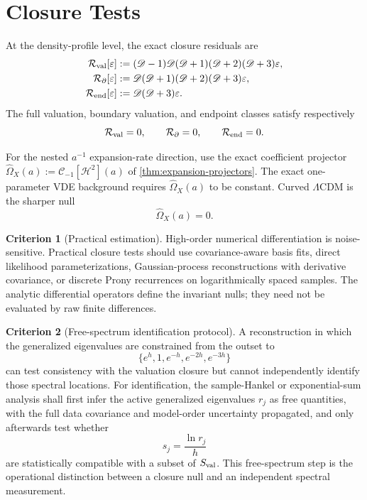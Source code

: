 \documentclass[aps,prd,preprint,onecolumn,nofootinbib,superscriptaddress,showkeys]{revtex4-2}
\numberwithin{equation}{section}
\theoremstyle{definition}
\newtheorem{criterion}{Criterion}[section]
\theoremstyle{plain}
\newcommand{\Dil}{\mathscr D}
\begin{document}
\section{Closure Tests}

At the density-profile level, the exact closure residuals are
\begin{align}
\mathcal R_{\rm val}[\varepsilon]
&:=
(\Dil-1)\Dil(\Dil+1)(\Dil+2)(\Dil+3)\varepsilon,\\
\mathcal R_{\partial}[\varepsilon]
&:=
\Dil(\Dil+1)(\Dil+2)(\Dil+3)\varepsilon,\\
\mathcal R_{\rm end}[\varepsilon]
&:=
\Dil(\Dil+3)\varepsilon.
\end{align}
The full valuation, boundary valuation, and endpoint classes satisfy respectively
\begin{equation}
\mathcal R_{\rm val}=0,
\qquad
\mathcal R_{\partial}=0,
\qquad
\mathcal R_{\rm end}=0.
\end{equation}

For the nested \(a^{-1}\) expansion-rate direction, use the exact coefficient projector \(\widehat\Omega_X(a):=\mathcal C_{-1}[\mathcal H^2](a)\) of \cref{thm:expansion-projectors}.
The exact one-parameter VDE background requires \(\widehat\Omega_X(a)\) to be constant.  Curved \(\Lambda\)CDM is the sharper null
\begin{equation}
\widehat\Omega_X(a)=0.
\end{equation}

\begin{criterion}[Practical estimation]
High-order numerical differentiation is noise-sensitive.  Practical closure tests should use covariance-aware basis fits, direct likelihood parameterizations, Gaussian-process reconstructions with derivative covariance, or discrete Prony recurrences on logarithmically spaced samples.  The analytic differential operators define the invariant nulls; they need not be evaluated by raw finite differences.
\end{criterion}

\begin{criterion}[Free-spectrum identification protocol]\label{crit:free-spectrum}
A reconstruction in which the generalized eigenvalues are constrained from the outset to
\[
\{e^{h},1,e^{-h},e^{-2h},e^{-3h}\}
\]
can test consistency with the valuation closure but cannot independently identify those spectral locations.  For identification, the sample-Hankel or exponential-sum analysis shall first infer the active generalized eigenvalues $r_j$ as free quantities, with the full data covariance and model-order uncertainty propagated, and only afterwards test whether
\[
 s_j=\frac{\ln r_j}{h}
\]
are statistically compatible with a subset of $S_{\rm val}$.  This free-spectrum step is the operational distinction between a closure null and an independent spectral measurement.
\end{criterion}
\end{document}

